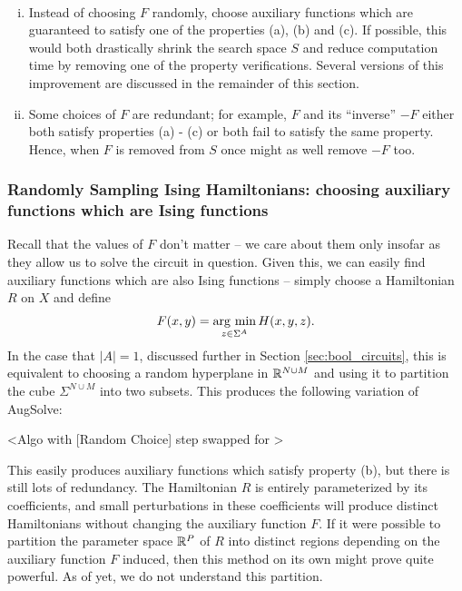 \documentclass{article}
\begin{document}
\begin{idea}\label{idea:improvements_to_AugSolve}$ $
  \begin{enumerate}[(i)]
    \item Instead of choosing $F$ randomly, choose auxiliary functions which are guaranteed to satisfy one of the properties (a), (b) and (c). If possible, this would both drastically shrink the search space $S$ and reduce computation time by removing one of the property verifications. Several versions of this improvement are discussed in the remainder of this section.
    \item Some choices of $F$ are redundant; for example, $F$ and its ``inverse'' $-F$ either both satisfy properties (a) - (c) or both fail to satisfy the same property. Hence, when $F$ is removed from $S$ once might as well remove $-F$ too.
  \end{enumerate}
\end{idea}

\subsubsection{Randomly Sampling Ising Hamiltonians: choosing auxiliary functions which are Ising functions}
Recall that the values of $F$ don't matter -- we care about them only insofar as they allow us to solve the circuit in question. Given this, we can easily find auxiliary functions which are also Ising functions -- simply choose a Hamiltonian $R$ on $X$ and define
\begin{align*}
  F(x,y) = \operatorname*{arg ~ min}_{z \in \Sigma^A} H(x,y,z).
\end{align*}
In the case that $|A| = 1$, discussed further in Section \ref{sec:bool_circuits}, this is equivalent to choosing a random hyperplane in $\mathbb{R}^{N\cup M}$ and using it to partition the cube $\Sigma^{N\cup M}$ into two subsets. This produces the following variation of AugSolve:

\bigskip

\bigg<Algo with [Random Choice] step swapped for \bigg>

\bigskip

This easily produces auxiliary functions which satisfy property (b), but there is still lots of redundancy. The Hamiltonian $R$ is entirely parameterized by its coefficients, and small perturbations in these coefficients will produce distinct Hamiltonians without changing the auxiliary function $F$. If it were possible to partition the parameter space $\mathbb{R}^P$ of $R$ into distinct regions depending on the auxiliary function $F$ induced, then this method on its own might prove quite powerful. As of yet, we do not understand this partition.
\end{document}
